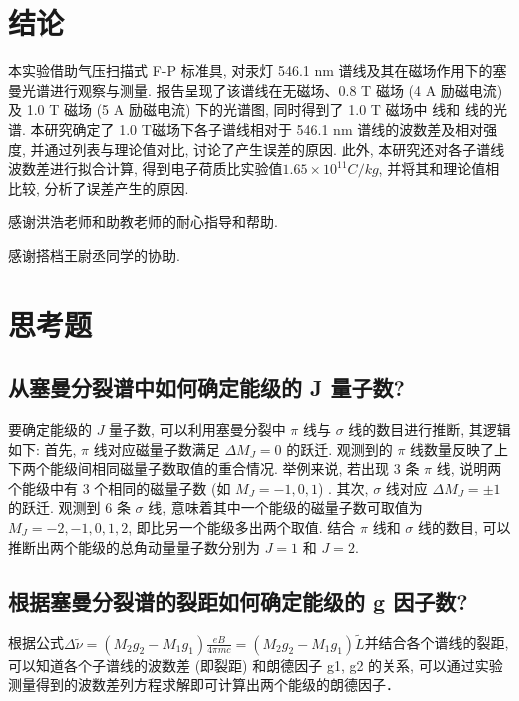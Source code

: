 \documentclass[font=default]{mpltx}
\begin{document}
 
\section{结论}
  本实验借助气压扫描式 F-P 标准具, 
  对汞灯 546.1 nm 谱线及其在磁场作用下的塞曼光谱进行观察与测量.
  报告呈现了该谱线在无磁场、0.8 T 磁场 (4 A 励磁电流) 及 1.0 T 磁场 (5 A 励磁电流) 下的光谱图, 
  同时得到了 1.0 T 磁场中 \pi 线和 \sigma 线的光谱. 
  本研究确定了 1.0 T磁场下各子谱线相对于 546.1 nm 谱线的波数差及相对强度, 
  并通过列表与理论值对比, 讨论了产生误差的原因.
  此外, 本研究还对各子谱线波数差进行拟合计算, 得到电子荷质比实验值$1.65 \times 10^{11} C/kg$, 并将其和理论值相比较, 分析了误差产生的原因.

\begin{acknowledgments}
  感谢洪浩老师和助教老师的耐心指导和帮助.
  \par
  感谢搭档王尉丞同学的协助.
\end{acknowledgments}



\clearpage %
\appendix %
\section{思考题}\label{app:exercise}
\subsection{从塞曼分裂谱中如何确定能级的 J 量子数?}
要确定能级的 $J$ 量子数, 可以利用塞曼分裂中 $\pi$ 线与 $\sigma$ 线的数目进行推断, 其逻辑如下:
首先, $\pi$ 线对应磁量子数满足 $\Delta M_J = 0$ 的跃迁. 
观测到的 $\pi$ 线数量反映了上下两个能级间相同磁量子数取值的重合情况. 
举例来说, 若出现 3 条 $\pi$ 线, 说明两个能级中有 3 个相同的磁量子数 (如 $M_J = -1, 0, 1$) . 
其次, $\sigma$ 线对应 $\Delta M_J = \pm 1$ 的跃迁. 
观测到 6 条 $\sigma$ 线, 意味着其中一个能级的磁量子数可取值为 $M_J = -2, -1, 0, 1, 2$, 即比另一个能级多出两个取值. 
结合 $\pi$ 线和 $\sigma$ 线的数目, 
可以推断出两个能级的总角动量量子数分别为 $J = 1$ 和 $J = 2$. 
\subsection{根据塞曼分裂谱的裂距如何确定能级的 g 因子数?}
根据公式$\Delta \widetilde{\nu} = (M_2 g_2 - M_1 g_1) \frac{eB}{4\pi m c} = (M_2 g_2 - M_1 g_1) \widetilde{L}$并结合各个谱线的裂距, 
可以知道各个子谱线的波数差 (即裂距) 和朗德因子 g1, g2 的关系, 可以通过实验测量得到的波数差列方程求解即可计算出两个能级的朗德因子．





\end{document}
